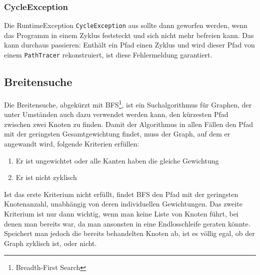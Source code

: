                 
            
            \subsubsection{CycleException}
    
                Die RuntimeException \lstinline{CycleException} aus  sollte dann geworfen werden, wenn das Programm in einem Zyklus feststeckt und sich nicht mehr befreien kann. Das kann durchaus passieren: Enthält ein Pfad einen Zyklus und wird dieser Pfad von einem \lstinline{PathTracer} rekonstruiert, ist diese Fehlermeldung garantiert.
    
            

        \subsection{Breitensuche} \label{bfs}
        
            Die Breitensuche, abgekürzt mit BFS\footnote{Breadth-First Search}, ist ein Suchalgorithmus für Graphen, der unter Umständen auch dazu verwendet werden kann, den kürzesten Pfad zwischen zwei Knoten zu finden. Damit der Algorithmus in allen Fällen den Pfad mit der geringsten Gesamtgewichtung findet, muss der Graph, auf dem er angewandt wird, folgende Kriterien erfüllen:

            \begin{enumerate}
                \item Er ist ungewichtet oder alle Kanten haben die gleiche Gewichtung
                
                \item Er ist nicht zyklisch
            \end{enumerate}

            Ist das erste Kriterium nicht erfüllt, findet BFS den Pfad mit der geringsten Knotenanzahl, unabhängig von deren individuellen Gewichtungen. Das zweite Kriterium ist nur dann wichtig, wenn man keine Liste von Knoten führt, bei denen man bereits war, da man ansonsten in eine Endlosschleife geraten könnte. Speichert man jedoch die bereits behandelten Knoten ab, ist es völlig egal, ob der Graph zyklisch ist, oder nicht.
            

